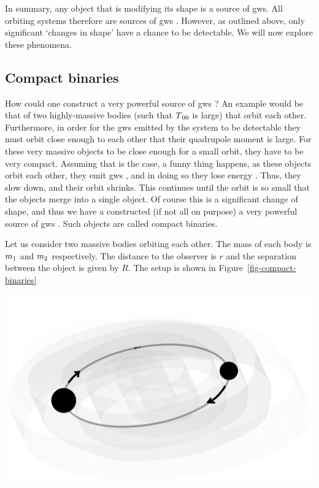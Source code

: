 \documentclass[
  11pt,
  a4paper,
  DIV=11,
  numbers=noendperiod,
  oneside]{scrreprt}
\DeclareRobustCommand{\[}{\begin{equation}}
\DeclareRobustCommand{\]}{\end{equation}}
\begin{document}
In summary, any object that is modifying its shape is a source of
\glspl{gw}. All orbiting systems therefore are sources of \glspl{gw} .
However, as outlined above, only significant `changes in shape' have a
chance to be detectable. We will now explore these phenomena.

\hypertarget{sec-compactbinaries}{%
\subsection{Compact binaries}\label{sec-compactbinaries}}

How could one construct a very powerful source of \glspl{gw} ? An
example would be that of two highly-massive bodies (such that
\(\SEco[00]\) is large) that orbit each other. Furthermore, in order for
the \glspl{gw} emitted by the system to be detectable they must orbit
close enough to each other that their quadrupole moment is large. For
these very massive objects to be close enough for a small orbit, they
have to be very compact. Assuming that is the case, a funny thing
happens, as these objects orbit each other, they emit \glspl{gw} , and
in doing so they lose energy . Thus, they slow down,
and their orbit shrinks. This continues until the orbit is so small that
the objects merge into a single object. Of course this is a significant
change of shape, and thus we have a constructed (if not all on purpose)
a very powerful source of \glspl{gw} . Such objects are called compact
binaries.

Let us consider two massive bodies orbiting each other. The mass of each
body is \(\mass[1]\) and \(\mass[2]\) respectively. The distance to the
observer is \(r\) and the separation between the object is given by
\(R\). The setup is shown in Figure~\ref{fig-compact-binaries}

\begin{marginfigure}


{\centering \includegraphics{./Compact binaries.png}

}

\end{marginfigure}
\end{document}
